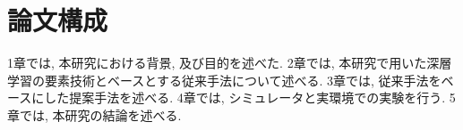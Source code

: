 
\section{論文構成}
1章では, 本研究における背景,  及び目的を述べた. 2章では, 本研究で用いた深層学習の要素技術とベースとする従来手法について述べる. 3章では, 従来手法をベースにした提案手法を述べる. 4章では, シミュレータと実環境での実験を行う. 5章では, 本研究の結論を述べる.


\newpage
